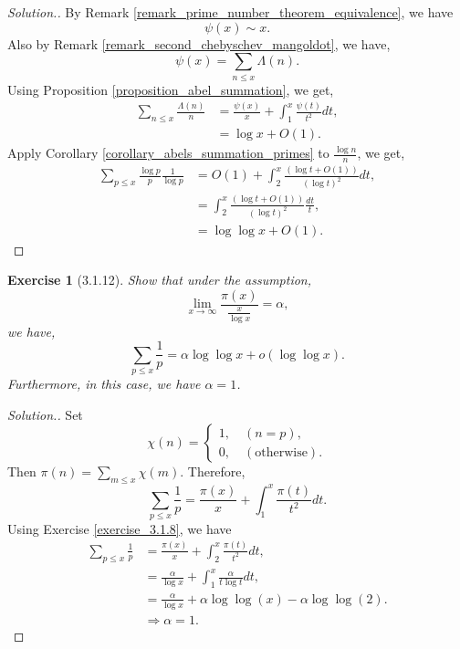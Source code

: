 \documentclass{article}
\newtheorem{exercise}{Exercise}[section]
\begin{document}
\begin{proof}[Solution.]
By Remark \ref{remark_prime_number_theorem_equivalence}, we have 
\begin{equation*}
  \psi(x) \sim x.
\end{equation*}
Also by Remark \ref{remark_second_chebyschev_mangoldot}, we have,
\begin{equation*}
  \psi(x) = \sum_{n\leq x}\Lambda(n).
\end{equation*}
Using Proposition \ref{proposition_abel_summation}, we get,
\begin{align*}
  \sum_{n\leq x}{\frac {\Lambda(n)} n} & = {\frac {\psi(x)} x} + \int_1^x {\frac {\psi(t)} {t^2}}dt,\\
  & =\log x+O(1).
\end{align*}
Apply Corollary \ref{corollary_abels_summation_primes} to ${\frac {\log n} n}$, we get,
\begin{align*}
  \sum_{p\leq x}{\frac {\log p} p}{\frac 1 {\log p}} & = O(1)+\int_2^x {\frac {(\log t+O(1))} {(\log t)^2}}dt,\\
  & = \int_2^x {\frac {(\log t+O(1))} {(\log t)^2}}{\frac {dt} t},\\
  & = \log\log x+O(1).
\end{align*}
\end{proof}

\begin{exercise}[3.1.12]
  Show that under the assumption,
  \begin{equation*}
    \lim_{x\to\infty}{\frac {\pi(x)} {{\frac x {\log x}}}} = \alpha,
  \end{equation*}
  we have,
  \begin{equation*}
    \sum_{p\leq x}{\frac 1 p} = \alpha\log\log x+o(\log\log x).
  \end{equation*}
  Furthermore, in this case, we have $\alpha=1$.
\end{exercise}

\begin{proof}[Solution.]
  Set 
  \begin{equation*}
    \chi(n) = \begin{cases}
      1,\quad(n=p),\\
      0,\quad(\text{otherwise}).
    \end{cases}
  \end{equation*}
  Then $\pi(n) = \sum_{m\leq x}\chi(m)$. Therefore,
  \begin{equation*}
    \sum_{p\leq x}{\frac 1 p} = {\frac {\pi(x)} x}+\int_1^x{\frac {\pi(t)} {t^2}}dt.
  \end{equation*}
  Using Exercise \ref{exercise_3.1.8}, we have 
  \begin{align*}
    \sum_{p\leq x}{\frac 1 p}& = {\frac {\pi(x)} x}+\int_2^x{\frac {\pi(t)} {t^2}}dt,\\
    & = {\frac \alpha {\log x}}+\int_1^x{\frac {\alpha} {t\log t}}dt,\\
    & = {\frac \alpha {\log x}}+\alpha\log\log(x)-\alpha\log\log(2).\\
    &\Rightarrow \alpha=1.
  \end{align*}
\end{proof}
\end{document}
